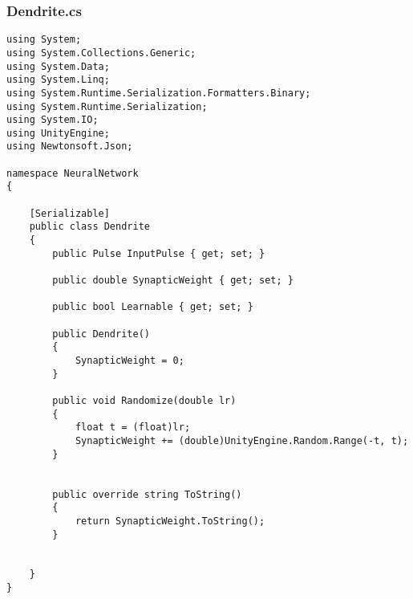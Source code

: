 \documentclass[12pt,a4paper]{article}
\begin{document}
\subsubsection*{Dendrite.cs}
\begin{lstlisting}
using System;
using System.Collections.Generic;
using System.Data;
using System.Linq;
using System.Runtime.Serialization.Formatters.Binary;
using System.Runtime.Serialization;
using System.IO;
using UnityEngine;
using Newtonsoft.Json;

namespace NeuralNetwork
{

    [Serializable]
    public class Dendrite
    {
        public Pulse InputPulse { get; set; }

        public double SynapticWeight { get; set; }

        public bool Learnable { get; set; }

        public Dendrite()
        {
            SynapticWeight = 0;
        }

        public void Randomize(double lr)
        {
            float t = (float)lr;
            SynapticWeight += (double)UnityEngine.Random.Range(-t, t);
        }
    

        public override string ToString()
        {
            return SynapticWeight.ToString();
        }
       

    }
}






\end{lstlisting}
\pagebreak
\end{document}
